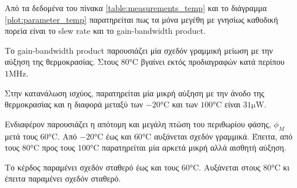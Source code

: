 Από τα δεδομένα του πίνακα \ref{table:measurements_temp} και το διάγραμμα \ref{plot:parameter_temp} παρατηρείται πως τα μόνα μεγέθη με γνησίως καθοδική πορεία είναι το slew rate και το gain-bandwidth product.\par
Το gain-bandwidth product παρουσιάζει μία σχεδόν γραμμική μείωση με την αύξηση της θερμοκρασίας. Στους $80\unit{\celsius}$ βγαίνει εκτός προδιαγραφών κατά περίπου $1\unit{\mega\hertz}$.\par
Στην κατανάλωση ισχύος, παρατηρείται μία μικρή αύξηση με την άνοδο της θερμοκρασίας και η διαφορά μεταξύ των $-20\unit{\celsius}$ και των $100\unit{\celsius}$ είναι $31\unit{\micro\watt}$.\par
Ενδιαφέρον παρουσιάζει η απότομη και μεγάλη πτώση του περιθωρίου φάσης, $\phi_M$ μετά τους $60\unit{\celsius}$. Από $-20\unit{\celsius}$ έως και $60\unit{\celsius}$ αυξάνεται σχεδόν γραμμικά. Έπειτα, από τους $80\unit{\celsius}$ προς τους $100\unit{\celsius}$ παρατηρείται μία αρκετά μικρή αλλά αισθητή αύξηση.\par
Το κέρδος παραμένει σχεδόν σταθερό έως και τους $60\unit{\celsius}$. Αυξάνεται στους $80\unit{\celsius}$ κι έπειτα παραμένει σχεδόν σταθερό.\par